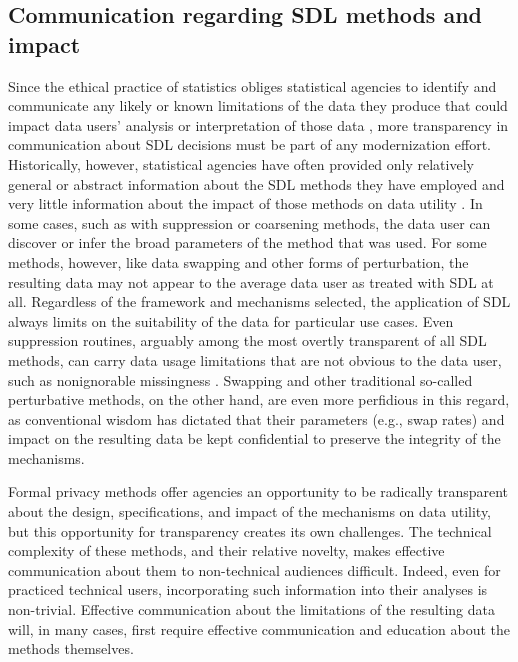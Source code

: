 \subsection{Communication regarding SDL methods and impact}
Since the ethical practice of statistics obliges statistical agencies to identify and communicate any likely or known limitations of the data they produce that could impact data users' analysis or interpretation of those data \cite{asa:2022}, more transparency in communication about SDL decisions must be part of any modernization effort. Historically, however, statistical agencies have often provided only relatively general or abstract information about the SDL methods they have employed and very little information about the impact of those methods on data utility \cite{abowd:schumtte:2015}. In some cases, such as with suppression or coarsening methods, the data user can discover or infer the broad parameters of the method that was used. For some methods, however, like data swapping and other forms of perturbation, the resulting data may not appear to the average data user as treated with SDL at all. Regardless of the framework and mechanisms selected, the application of SDL always limits on the suitability of the data for particular use cases. Even suppression routines, arguably among the most overtly transparent of all SDL methods, can carry data usage limitations that are not obvious to the data user, such as nonignorable missingness \cite{littlerubin,abowd:schumtte:2015}. Swapping and other traditional so-called perturbative methods, on the other hand, are even more perfidious in this regard, as conventional wisdom has dictated that their parameters (e.g., swap rates) and impact on the resulting data be kept confidential to preserve the integrity of the mechanisms.

Formal privacy methods offer agencies an opportunity to be radically transparent about the design, specifications, and impact of the mechanisms on data utility, but this opportunity for transparency creates its own challenges. The technical complexity of these methods, and their relative novelty, makes effective communication about them to non-technical audiences difficult. Indeed, even for practiced technical users, incorporating such information into their analyses is non-trivial. Effective communication about the limitations of the resulting data will, in many cases, first require effective communication and education about the methods themselves.

